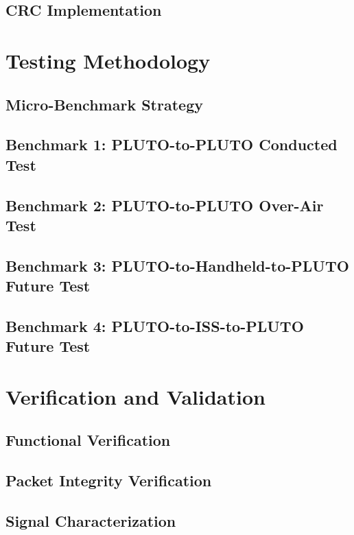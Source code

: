 \documentclass[conference]{IEEEtran}
\begin{document}
\subsection{CRC Implementation}

\section{Testing Methodology}

\subsection{Micro-Benchmark Strategy}

\subsection{Benchmark 1: PLUTO-to-PLUTO Conducted Test}

\subsection{Benchmark 2: PLUTO-to-PLUTO Over-Air Test}

\subsection{Benchmark 3: PLUTO-to-Handheld-to-PLUTO Future Test}

\subsection{Benchmark 4: PLUTO-to-ISS-to-PLUTO Future Test}

\section{Verification and Validation}

\subsection{Functional Verification}

\subsection{Packet Integrity Verification}

\subsection{Signal Characterization}
\end{document}
